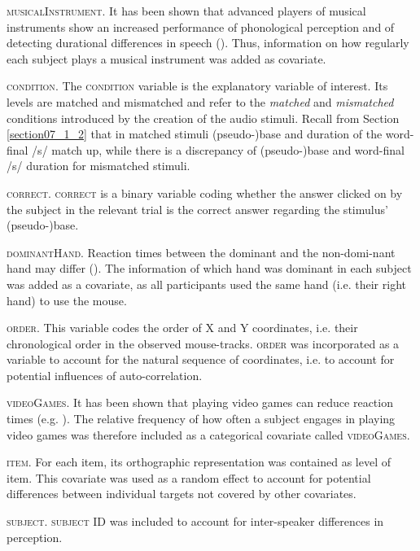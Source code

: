 \textsc{musicalInstrument}. It has been shown that advanced players of musical instruments show an increased performance of phonological perception and of detecting durational differences in speech (\cite{Anvari2002, Milovanov2009}). Thus, information on how regularly each subject plays a musical instrument was added as covariate.

\textsc{condition}. The \textsc{condition} variable is the explanatory variable of interest. Its levels are matched and mismatched and refer to the \textit{matched} and \textit{mismatched} conditions introduced by the creation of the audio stimuli. Recall from Section \ref{section07_1_2} that in matched stimuli (pseudo-)base and duration of the word-final /s/ match up, while there is a discrepancy of (pseudo-)base and word-final /s/ duration for mismatched stimuli. 

\textsc{correct}. \textsc{correct} is a binary variable coding whether the answer clicked on by the subject in the relevant trial is the correct answer regarding the stimulus' (pseudo-)base.

\textsc{dominantHand}. Reaction times between the dominant and the non-domi-nant hand may differ (\cite{Gignac2004}). The information of which hand was dominant in each subject was added as a covariate, as all participants used the same hand (i.e. their right hand) to use the mouse.

\textsc{order}. This variable codes the order of X and Y coordinates, i.e. their chronological order in the observed mouse-tracks. \textsc{order} was incorporated as a variable to account for the natural sequence of coordinates, i.e. to account for potential influences of auto-correlation. 

\textsc{videoGames}. It has been shown that playing video games can reduce reaction times (e.g. \cite{Dye2009}). The relative frequency of how often a subject engages in playing video games was therefore included as a categorical covariate called \textsc{videoGames}.

\textsc{item}. For each item, its orthographic representation was contained as level of item. This covariate was used as a random effect to account for potential differences between individual targets not covered by other covariates.

\textsc{subject}. \textsc{subject} ID was included to account for inter-speaker differences in perception.

